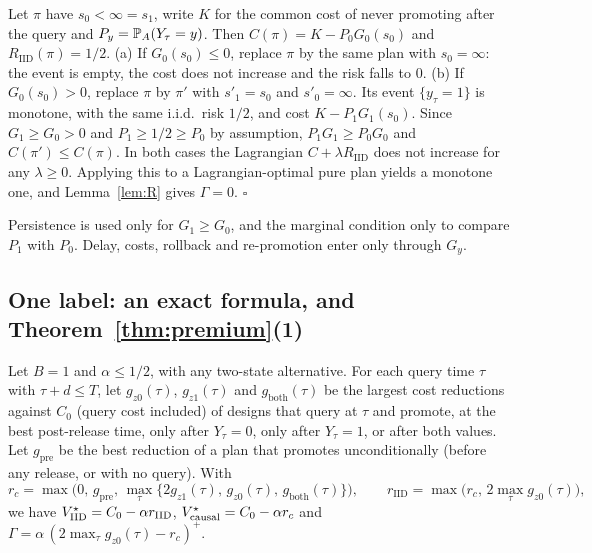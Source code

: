 Let $\pi$ have $s_0<\infty=s_1$, write $K$ for the common cost of never promoting after the query and $P_y=\mathbb{P}_A(Y_\tau=y)$. Then $C(\pi)=K-P_0G_0(s_0)$ and $R_{\mathrm{IID}}(\pi)=1/2$.
(a) If $G_0(s_0)\le0$, replace $\pi$ by the same plan with $s_0=\infty$: the event is empty, the cost does not increase and the risk falls to 0.
(b) If $G_0(s_0)>0$, replace $\pi$ by $\pi'$ with $s'_1=s_0$ and $s'_0=\infty$. Its event $\{y_\tau=1\}$ is monotone, with the same i.i.d.\ risk $1/2$, and cost $K-P_1G_1(s_0)$. Since $G_1\ge G_0>0$ and $P_1\ge1/2\ge P_0$ by assumption, $P_1G_1\ge P_0G_0$ and $C(\pi')\le C(\pi)$.
In both cases the Lagrangian $C+\lambda R_{\mathrm{IID}}$ does not increase for any $\lambda\ge0$. Applying this to a Lagrangian-optimal pure plan yields a monotone one, and Lemma~\ref{lem:R} gives $\Gamma=0$. \hfill$\square$

Persistence is used only for $G_1\ge G_0$, and the marginal condition only to compare $P_1$ with $P_0$. Delay, costs, rollback and re-promotion enter only through $G_y$.

\subsection{One label: an exact formula, and Theorem~\ref{thm:premium}(1)}

\begin{lemma}
\label{lem:N1}
Let $B=1$ and $\alpha\le1/2$, with any two-state alternative. For each query time $\tau$ with $\tau+d\le T$, let $g_{z0}(\tau)$, $g_{z1}(\tau)$ and $g_{\mathrm{both}}(\tau)$ be the largest cost reductions against $C_0$ (query cost included) of designs that query at $\tau$ and promote, at the best post-release time, only after $Y_\tau=0$, only after $Y_\tau=1$, or after both values. Let $g_{\mathrm{pre}}$ be the best reduction of a plan that promotes unconditionally (before any release, or with no query). With
\[
r_c=\max\big(0,\,g_{\mathrm{pre}},\,\max_\tau\{2g_{z1}(\tau),\,g_{z0}(\tau),\,g_{\mathrm{both}}(\tau)\}\big),\qquad r_{\mathrm{IID}}=\max\big(r_c,\,2\max_\tau g_{z0}(\tau)\big),
\]
we have $V^\star_{\mathrm{IID}}=C_0-\alpha r_{\mathrm{IID}}$, $V^\star_{\mathrm{causal}}=C_0-\alpha r_c$ and $\Gamma=\alpha\,(2\max_\tau g_{z0}(\tau)-r_c)^+$.
\end{lemma}

